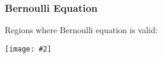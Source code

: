 \documentclass[12pt,aspectratio=169]{beamer}
\newcommand{\pic}[2]{\texttt{[image: \#2]}}
\newcommand{\mb}[1]{\mathbf{#1}}
\newcommand{\eq}[2]{\vspace{#1}{\Large\begin{displaymath}#2\end{displaymath}}}
\begin{document}
%
%    
%
%
%
%
%
%
%



\begin{frame}
  \frametitle{Bernoulli Equation}

  Regions where Bernoulli equation is valid:
  \begin{center}
    \pic{.8}{bernoulli.jpg}
  \end{center}
\end{frame}
\end{document}
